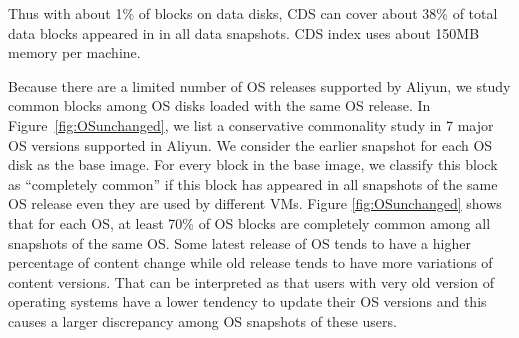 Thus with about 1\% of blocks on data disks, CDS can cover about 38\% of total data blocks
appeared in in all data snapshots. CDS index uses about 150MB memory per machine.






Because there are a limited number of OS releases supported by Aliyun, we study common blocks  among
OS disks loaded with  the same OS release. 
In  Figure~\ref{fig:OSunchanged},  we list a conservative  commonality study in 7 major OS versions  supported
in Aliyun.  We consider the earlier snapshot for each OS disk as the base image.
For every block in the base image, we classify this block as ``completely common''
if  this block has appeared in all snapshots of the same OS release even they are used by different VMs.
Figure \ref{fig:OSunchanged} shows that for each
OS,  at least 70\% of OS blocks are completely common among all snapshots of the same OS. 
Some latest release  of OS tends to have a higher percentage of content change
while  old release tends to have more variations of content versions.
That can be interpreted as that users with very old  version of operating systems
have a lower tendency to update their OS versions and this causes a larger discrepancy
among OS snapshots of these users.

